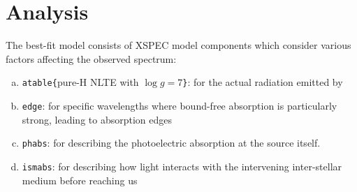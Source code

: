 \section{Analysis} \label{sec:analysis}
	The best-fit model consists of XSPEC model components which consider various factors affecting the observed spectrum:
    \begin{enumerate}[a)]
   		\item \texttt{atable\{}pure-H NLTE with $\log{g}=7$\texttt{\}}: for the actual radiation emitted by \source
   		\item \texttt{edge}: for specific wavelengths where bound-free absorption is particularly strong, leading to absorption edges
   		\item \texttt{phabs}: for describing the photoelectric absorption at the source itself.
   		\item \texttt{ismabs}: for describing how light interacts with the intervening inter-stellar medium before reaching us
   	\end{enumerate}